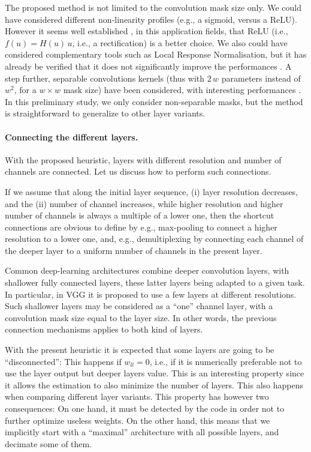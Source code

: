\documentclass[twocolumn]{article}
\begin{document}
The proposed method is not limited to the convolution mask size only. We could have considered different non-linearity profiles (e.g., a sigmoid, versus a ReLU). However  it seems well established \cite{Glorot2010Understanding}, in this application fields, that ReLU (i.e., $f(u) = H(u) \, u$, i.e., a rectification) is a better choice. We also could have considered complementary tools such as Local Response Normalisation, but it has already be verified that it does not significantly improve the performances \cite{Simonyan2015Very}. A step further, separable convolutions kernels (thus with $2\,w$ parameters instead of $w^2$, for a $w \times w$ mask size) have been considered, with interesting performances \cite{Chollet2016Xception}. In this preliminary study, we only consider non-separable masks, but the method is straightforward to generalize to other layer variants.

\paragraph*{Connecting the different layers.}

With the proposed heuristic, layers with different resolution and number of channels are connected. Let us discuss how to perform such connections.

If we assume that along the initial layer sequence, (i) layer resolution decreases, and the (ii) number of channel increases, while higher resolution and higher number of channels is always a multiple of a lower one, then the shortcut connections are obvious to define by e.g., max-pooling to connect a higher resolution to a lower one, and, e.g., demultiplexing by connecting each channel of the deeper layer to a uniform number of channels in the present layer.

Common deep-learning architectures combine deeper convolution layers, with shallower fully connected layers, these latter layers being adapted to a given task. In particular, in VGG it is proposed to use a few layers at different resolutions. Such shallower layers may be considered as a ``one'' channel layer, with a convolution mask size equal to the layer size. In other words, the previous connection mechanisms applies to both kind of layers.

With the present heuristic it is expected that some layers are going to be ``disconnected'': This happens if $w_{ll} = 0$, i.e., if it is numerically preferable not to use the layer output but deeper layers value. This is an interesting property since it allows the estimation to also minimize the number of layers. This also happens when comparing different layer variants. This property has however two consequences: On one hand, it must be detected by the code in order not to further optimize useless weights. On the other hand, this means that we implicitly start with a ``maximal'' architecture with all possible layers, and decimate some of them. 
\end{document}
